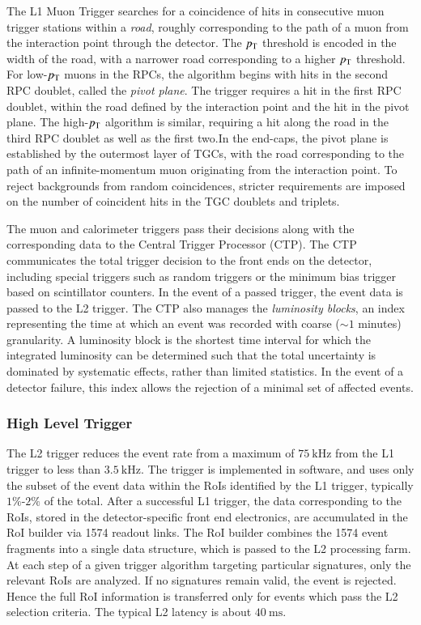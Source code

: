 The L1 Muon Trigger searches for a coincidence of hits in consecutive muon trigger stations within a \emph{road}, roughly corresponding to the path of a muon from the interaction point through the detector. The $p_{\text{T}}$ threshold is encoded in the width of the road, with a narrower road corresponding to a higher $p_{\text{T}}$ threshold. For low-$p_{\text{T}}$ muons in the RPCs, the algorithm begins with hits in the second RPC doublet, called the \emph{pivot plane}. The trigger requires a hit in the first RPC doublet, within the road defined by the interaction point and the hit in the pivot plane. The high-$p_{\text{T}}$ algorithm is similar, requiring a hit along the road in the third RPC doublet as well as the first two.In the end-caps, the pivot plane is established by the outermost layer of TGCs, with the road corresponding to the path of an infinite-momentum muon originating from the interaction point. To reject backgrounds from random coincidences, stricter requirements are imposed on the number of coincident hits in the TGC doublets and triplets.

The muon and calorimeter triggers pass their decisions along with the corresponding data to the Central Trigger Processor (CTP). The CTP communicates the total trigger decision to the front ends on the detector, including special triggers such as random triggers or the minimum bias trigger based on scintillator counters. In the event of a passed trigger, the event data is passed to the L2 trigger. The CTP also manages the \emph{luminosity blocks}, an index representing the time at which an event was recorded with coarse ($\sim1$ minutes) granularity. A luminosity block is the shortest time interval for which the integrated luminosity can be determined such that the total uncertainty is dominated by systematic effects, rather than limited statistics. In the event of a detector failure, this index allows the rejection of a minimal set of affected events. 

\subsubsection{High Level Trigger}\label{sec:experiment-trigger-HLT}

The L2 trigger reduces the event rate from a maximum of $75~\mbox{kHz}$ from the L1 trigger to less than $\SI{3.5}{\kilo\hertz}$. The trigger is implemented in software, and uses only the subset of the event data within the RoIs identified by the L1 trigger, typically $1\%$-$2\%$ of the total. After a successful L1 trigger, the data corresponding to the RoIs, stored in the detector-specific front end electronics, are accumulated in the RoI builder via 1574 readout links. The RoI builder combines the 1574 event fragments into a single data structure, which is passed to the L2 processing farm. At each step of a given trigger algorithm targeting particular signatures, only the relevant RoIs are analyzed. If no signatures remain valid, the event is rejected. Hence the full RoI information is transferred only for events which pass the L2 selection criteria. The typical L2 latency is about $\SI{40}{\milli\second}$.

